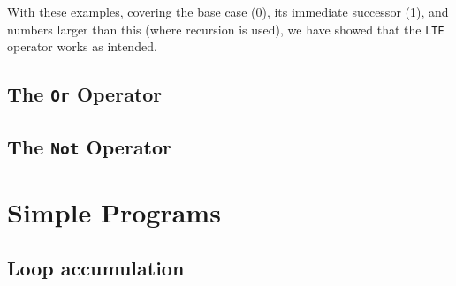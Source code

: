         With these examples, covering the base case (0), its immediate successor (1), and numbers larger than this (where recursion is used), we have showed that the \texttt{LTE} operator works as intended.
        
    
    \subsection{The \texttt{Or} Operator}\label{evaln:ops:or}
        
    
        
    
        
        
        
    
    \subsection{The \texttt{Not} Operator}\label{evaln:ops:not}
        
        
        

\newpage


\section{Simple Programs}\label{evaln:progs}
    \subsection{Loop accumulation}
        
